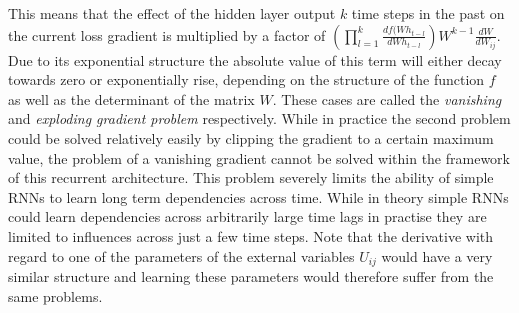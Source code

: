 This means that the effect of the hidden layer output $k$ time steps in the past on the current loss gradient is multiplied by a factor of $(\prod_{l = 1}^k \frac{df(Wh_{t-l}}{dWh_{t-l}}) W^{k-1}\frac{dW}{dW_{ij}}$. Due to its exponential structure the absolute value of this term  will either decay towards zero or exponentially rise, depending on the structure of the function $f$ as well as the determinant of the matrix $W$. These cases are called the \textit{vanishing} and \textit{exploding gradient problem} respectively. While in practice the second problem could be solved relatively easily by clipping the gradient to a certain maximum value, the problem of a vanishing gradient cannot be solved within the framework of this recurrent architecture. This problem severely limits the ability of simple RNNs to learn long term dependencies across time. While in theory simple RNNs could learn dependencies across arbitrarily large time lags in practise they are limited to influences across just a few time steps. Note that the derivative with regard to one of the parameters of the external variables $U_{ij}$ would have a very similar structure and learning these parameters would therefore suffer from the same problems.


